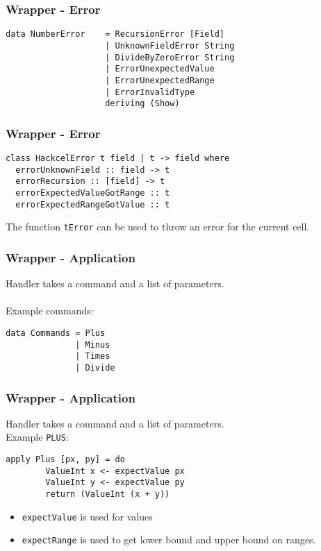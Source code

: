 \documentclass{beamer}
\begin{document}
  \begin{frame}[fragile]
  		\frametitle{Wrapper - Error}
		  		\begin{verbatim}
data NumberError    = RecursionError [Field]
                    | UnknownFieldError String
                    | DivideByZeroError String
                    | ErrorUnexpectedValue
                    | ErrorUnexpectedRange
                    | ErrorInvalidType
                    deriving (Show)
  		\end{verbatim}
  \end{frame}
    \begin{frame}[fragile]
  		\frametitle{Wrapper - Error}
		  		\begin{verbatim}
class HackcelError t field | t -> field where
  errorUnknownField :: field -> t
  errorRecursion :: [field] -> t
  errorExpectedValueGotRange :: t
  errorExpectedRangeGotValue :: t
  		\end{verbatim}
  		The function \texttt{tError} can be used to throw an error for the current cell.
  \end{frame}
	    \begin{frame}[fragile]
  		\frametitle{Wrapper - Application}
  		Handler takes a command and a list of parameters.
  		\\\\
  		Example commands:
  		\begin{verbatim}
data Commands = Plus
              | Minus
              | Times
              | Divide        
  		\end{verbatim}
  \end{frame}  
  \begin{frame}[fragile]
  \frametitle{Wrapper - Application}
  		Handler takes a command and a list of parameters.
  		\\
  		Example \texttt{PLUS}:
  		\begin{verbatim}
apply Plus [px, py] = do
		ValueInt x <- expectValue px 
		ValueInt y <- expectValue py
		return (ValueInt (x + y))
  		\end{verbatim}
  		\begin{itemize}
  		\item \texttt{expectValue} is used for values
  		\item \texttt{expectRange} is used to get lower bound and upper bound on ranges.
  		\end{itemize}
  \end{frame}  
  
\end{document}
